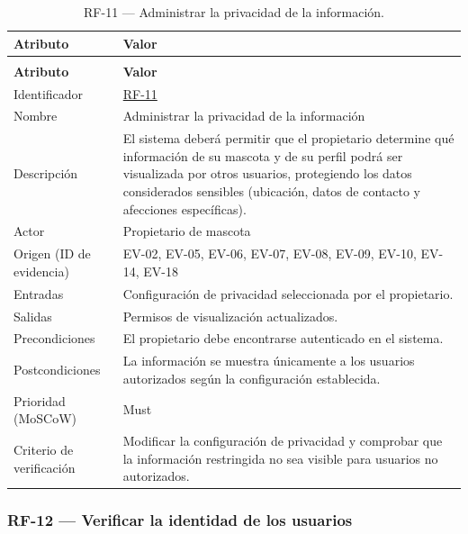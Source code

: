 \documentclass[journal,onecolumn]{IEEEtran}
\makeatletter
\newenvironment{atributos}[2]{%
	\small
	\begin{longtable}{@{}>{\raggedright\arraybackslash}p{4.2cm} >{\raggedright\arraybackslash}p{11.2cm}@{}}
		\caption{#2}\label{tab:#1}\\
		\toprule
		\textbf{Atributo} & \textbf{Valor} \\
		\midrule
		\endfirsthead
		\multicolumn{2}{@{}l}{\small\itshape (continuación)}\\
		\toprule
		\textbf{Atributo} & \textbf{Valor} \\
		\midrule
		\endhead
		\bottomrule
		\endlastfoot
	}{%
	\end{longtable}
	\normalsize
}
\makeatother
\begin{document}
	\begin{atributos}{RF-11}{RF-11 --- Administrar la privacidad de la información.}
		Identificador & \hyperref[tab:RF-11]{RF-11} \\
		Nombre & Administrar la privacidad de la información \\
		Descripción & El sistema deberá permitir que el propietario determine qué información de su mascota y de su perfil podrá ser visualizada por otros usuarios, protegiendo los datos considerados sensibles (ubicación, datos de contacto y afecciones específicas). \\
		Actor & Propietario de mascota \\
		Origen (ID de evidencia) & EV-02, EV-05, EV-06, EV-07, EV-08, EV-09, EV-10, EV-14, EV-18 \\
		Entradas & Configuración de privacidad seleccionada por el propietario. \\
		Salidas & Permisos de visualización actualizados. \\
		Precondiciones & El propietario debe encontrarse autenticado en el sistema. \\
		Postcondiciones & La información se muestra únicamente a los usuarios autorizados según la configuración establecida. \\
		Prioridad (MoSCoW) & Must \\
		Criterio de verificación & Modificar la configuración de privacidad y comprobar que la información restringida no sea visible para usuarios no autorizados. \\
	\end{atributos}
	
	\subsubsection{RF-12 --- Verificar la identidad de los usuarios}
	
\end{document}
